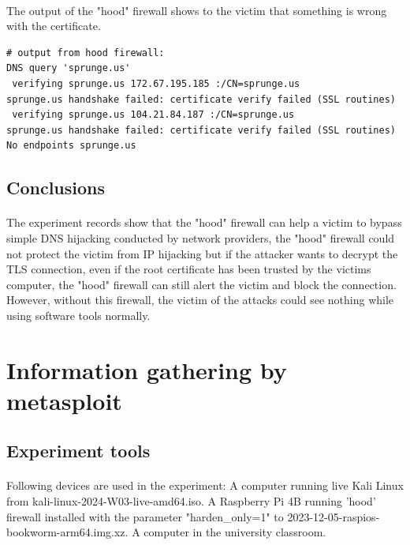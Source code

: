 \documentclass[mscthesis]{usiinfthesis}
\begin{document}
\paragraph{}
The output of the "hood" firewall shows to the victim that something is wrong with the certificate.

\begin{lstlisting}[language={},frame=single,breaklines=true,postbreak=\mbox{\textcolor{red}{$\hookrightarrow$}\space}]
# output from hood firewall:
DNS query 'sprunge.us'
 verifying sprunge.us 172.67.195.185 :/CN=sprunge.us
sprunge.us handshake failed: certificate verify failed (SSL routines)
 verifying sprunge.us 104.21.84.187 :/CN=sprunge.us
sprunge.us handshake failed: certificate verify failed (SSL routines)
No endpoints sprunge.us
\end{lstlisting}

\subsection{Conclusions}
\paragraph{}
The experiment records show that the "hood" firewall can help a victim to bypass simple DNS hijacking conducted by network providers, the "hood" firewall could not protect the victim from IP hijacking but if the attacker wants to decrypt the TLS connection, even if the root certificate has been trusted by the victims computer, the "hood" firewall can still alert the victim and block the connection. However, without this firewall, the victim of the attacks could see nothing while using software tools normally.

\section{Information gathering by metasploit}
\subsection{Experiment tools}
\paragraph{}
Following devices are used in the experiment: A computer running live Kali Linux from kali-linux-2024-W03-live-amd64.iso. A Raspberry Pi 4B running 'hood' firewall installed with the parameter "harden\_only=1" to 2023-12-05-raspios-bookworm-arm64.img.xz. A computer in the university classroom.
\end{document}

